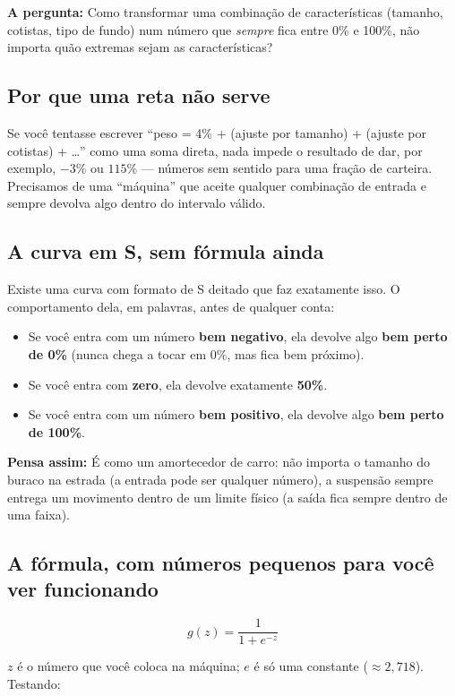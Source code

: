 \documentclass[11pt,a4paper]{article}
\newcommand{\pergunta}[1]{\par\vspace{4pt}\noindent\textbf{\color{azul}A pergunta:} #1\par\vspace{2pt}}
\newcommand{\analogia}[1]{\par\vspace{4pt}\noindent\textbf{\color{verde}Pensa assim:} #1\par\vspace{2pt}}
\begin{document}
\pergunta{Como transformar uma combinação de características (tamanho, cotistas, tipo de fundo)
num número que \emph{sempre} fica entre 0\% e 100\%, não importa quão extremas sejam as
características?}

\subsection{Por que uma reta não serve}

Se você tentasse escrever ``peso = 4\% + (ajuste por tamanho) + (ajuste por cotistas) + \dots''
como uma soma direta, nada impede o resultado de dar, por exemplo, $-3\%$ ou $115\%$ --- números
sem sentido para uma fração de carteira. Precisamos de uma ``máquina'' que aceite qualquer
combinação de entrada e sempre devolva algo dentro do intervalo válido.

\subsection{A curva em S, sem fórmula ainda}

Existe uma curva com formato de S deitado que faz exatamente isso. O comportamento dela, em
palavras, antes de qualquer conta:

\begin{itemize}[topsep=2pt,itemsep=2pt]
\item Se você entra com um número \textbf{bem negativo}, ela devolve algo \textbf{bem perto de
0\%} (nunca chega a tocar em 0\%, mas fica bem próximo).
\item Se você entra com \textbf{zero}, ela devolve exatamente \textbf{50\%}.
\item Se você entra com um número \textbf{bem positivo}, ela devolve algo \textbf{bem perto de
100\%}.
\end{itemize}

\analogia{É como um amortecedor de carro: não importa o tamanho do buraco na estrada (a entrada
pode ser qualquer número), a suspensão sempre entrega um movimento dentro de um limite físico
(a saída fica sempre dentro de uma faixa).}

\subsection{A fórmula, com números pequenos para você ver funcionando}

$$g(z) = \frac{1}{1+e^{-z}}$$

$z$ é o número que você coloca na máquina; $e$ é só uma constante ($\approx 2{,}718$). Testando:
\end{document}

